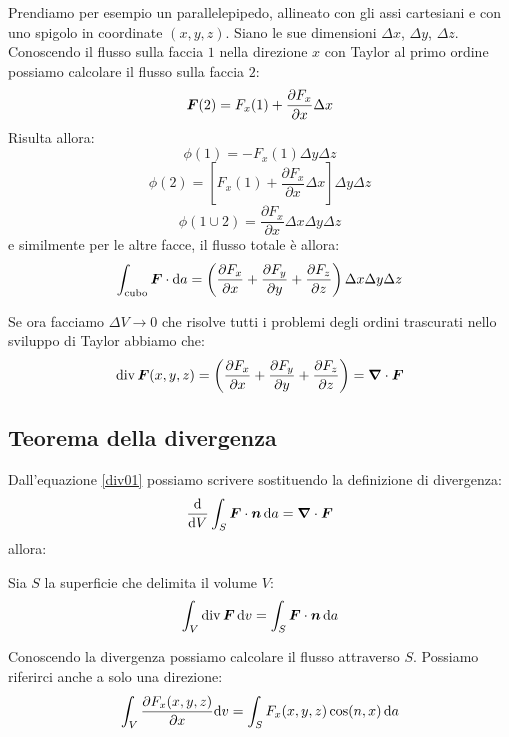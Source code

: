 Prendiamo per esempio un parallelepipedo, allineato con gli assi cartesiani e con uno spigolo in coordinate $(x,y,z)$. Siano le sue dimensioni $\Delta x$, $\Delta y$, $\Delta z$. Conoscendo il flusso sulla faccia $1$ nella direzione $x$ con Taylor al primo ordine possiamo calcolare il flusso sulla faccia $2$:
\begin{equation*}\boldsymbol{F}(2)= F_x(1)+\frac{\partial F_x}{\partial x}\Delta x\end{equation*}
Risulta allora:
\begin{equation*}\phi(1)=- F_x(1)\Delta y\Delta z\end{equation*}
\begin{equation*}\phi(2)=\left[F_x(1)+\frac{\partial F_x}{\partial x}\Delta x\right]\Delta y\Delta z\end{equation*}
\begin{equation*}\phi(1\cup 2)=\frac{\partial F_x}{\partial x}\Delta x\Delta y\Delta z\end{equation*}
e similmente per le altre facce, il flusso totale è allora:
\begin{equation*}\int_{\text{cubo}} \boldsymbol{F}\cdot\mathrm{d} a=\left(\frac{\partial F_x}{\partial x}+\frac{\partial F_y}{\partial y}+\frac{\partial F_z}{\partial z}\right)\Delta x\Delta y\Delta z\end{equation*}


Se ora facciamo $\Delta V\to 0$ che risolve tutti i problemi degli ordini trascurati nello sviluppo di Taylor abbiamo che:
\begin{equation}\label{div01}
\operatorname{div} \boldsymbol{F}(x,y,z)=\left(\frac{\partial F_x}{\partial x}+\frac{\partial F_y}{\partial y}+\frac{\partial F_z}{\partial z}\right)=\boldsymbol{\nabla}\cdot\boldsymbol{F}\end{equation}

\subsection{Teorema della divergenza}
Dall'equazione \eqref{div01} possiamo scrivere sostituendo la definizione di divergenza:
\begin{equation*}\frac{\mathrm{d}}{\mathrm{d} V}\int_S \boldsymbol{F}\cdot\boldsymbol{n}\,\mathrm{d} a=\boldsymbol{\nabla}\cdot\boldsymbol{F}\end{equation*}
allora:
\begin{Teo}[divergenza]
Sia $S$ la superficie che delimita il volume $V$:
\begin{equation*}\int_V\operatorname{div} \boldsymbol{F}\,\mathrm{d} v=\int_S\boldsymbol{F}\cdot\boldsymbol{n}\,\mathrm{d} a\end{equation*}
\end{Teo}
Conoscendo la divergenza possiamo calcolare il flusso attraverso $S$. Possiamo riferirci anche a solo una direzione:
\begin{equation*}\int_V\frac{\partial F_x(x,y,z)}{\partial x}\mathrm{d} v=\int_S F_x(x,y,z)\cos(n,x)\,\mathrm{d} a\end{equation*}

